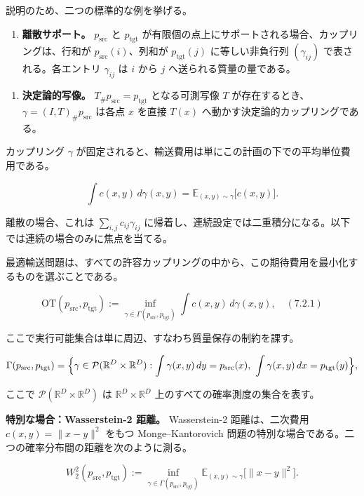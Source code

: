 説明のため、二つの標準的な例を挙げる。

\begin{enumerate}
\item \textbf{離散サポート。} $p_{\mathrm{src}}$ と $p_{\mathrm{tgt}}$ が有限個の点上にサポートされる場合、カップリングは、行和が $p_{\mathrm{src}}(i)$、列和が $p_{\mathrm{tgt}}(j)$ に等しい非負行列 $(\gamma_{ij})$ で表される。各エントリ $\gamma_{ij}$ は $i$ から $j$ へ送られる質量の量である。
\end{enumerate}


\begin{enumerate}
\item \textbf{決定論的写像。} $T_{\#}p_{\mathrm{src}}=p_{\mathrm{tgt}}$ となる可測写像 $T$ が存在するとき、$\gamma=(I,T)_{\#}p_{\mathrm{src}}$ は各点 $x$ を直接 $T(x)$ へ動かす決定論的カップリングである。
\end{enumerate}


カップリング $\gamma$ が固定されると、輸送費用は単にこの計画の下での平均単位費用である。

\[
\int c(x,y)\,d\gamma(x,y) = \mathbb{E}_{(x,y)\sim\gamma}\bigl[c(x,y)\bigr].
\]


離散の場合、これは $\sum_{i,j}c_{ij}\gamma_{ij}$ に帰着し、連続設定では二重積分になる。以下では連続の場合のみに焦点を当てる。

最適輸送問題は、すべての許容カップリングの中から、この期待費用を最小化するものを選ぶことである。

\[
\mathrm{OT}(p_{\mathrm{src}},p_{\mathrm{tgt}})
:=
\inf_{\gamma\in\Gamma(p_{\mathrm{src}},p_{\mathrm{tgt}})}
\int c(x,y)\,d\gamma(x,y),
\quad (7.2.1)
\]


ここで実行可能集合は単に周辺、すなわち質量保存の制約を課す。

\[
\Gamma(p_{\mathrm{src}},p_{\mathrm{tgt}})
=
\Bigl\{
\gamma\in\mathcal{P}(\mathbb{R}^D\times\mathbb{R}^D):
\int\gamma(x,y)\,dy=p_{\mathrm{src}}(x),\
\int\gamma(x,y)\,dx=p_{\mathrm{tgt}}(y)
\Bigr\},
\]


ここで $\mathcal{P}(\mathbb{R}^D\times\mathbb{R}^D)$ は $\mathbb{R}^D\times\mathbb{R}^D$ 上のすべての確率測度の集合を表す。

\textbf{特別な場合：Wasserstein-2 距離。} Wasserstein-2 距離は、二次費用 $c(x,y)=\|x-y\|^2$ をもつ Monge–Kantorovich 問題の特別な場合である。二つの確率分布間の距離を次のように測る。

\[
W_2^2(p_{\mathrm{src}},p_{\mathrm{tgt}})
:=
\inf_{\gamma\in\Gamma(p_{\mathrm{src}},p_{\mathrm{tgt}})}
\mathbb{E}_{(x,y)\sim\gamma}\bigl[\|x-y\|^2\bigr].
\]


